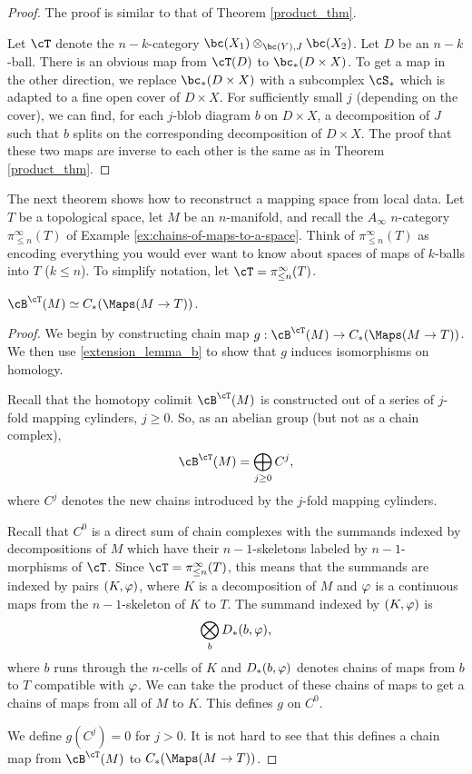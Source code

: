 \begin{proof}
The proof is similar to that of Theorem \ref{product_thm}.

Let $\cT$ denote the $n{-}k$-category $\bc(X_1) \otimes_{\bc(Y), J} \bc(X_2)$.
Let $D$ be an $n{-}k$-ball.
There is an obvious map from $\cT(D)$ to $\bc_*(D\times X)$.
To get a map in the other direction, we replace $\bc_*(D\times X)$ with a subcomplex
$\cS_*$ which is adapted to a fine open cover of $D\times X$.
For sufficiently small $j$ (depending on the cover), we can find, for each $j$-blob diagram $b$
on $D\times X$, a decomposition of $J$ such that $b$ splits on the corresponding
decomposition of $D\times X$.
The proof that these two maps are inverse to each other is the same as in
Theorem \ref{product_thm}.
\end{proof}


\medskip

The next theorem shows how to reconstruct a mapping space from local data.
Let $T$ be a topological space, let $M$ be an $n$-manifold, 
and recall the $A_\infty$ $n$-category $\pi^\infty_{\leq n}(T)$ 
of Example \ref{ex:chains-of-maps-to-a-space}.
Think of $\pi^\infty_{\leq n}(T)$ as encoding everything you would ever
want to know about spaces of maps of $k$-balls into $T$ ($k\le n$).
To simplify notation, let $\cT = \pi^\infty_{\leq n}(T)$.

\begin{thm} \label{thm:map-recon}
$\cB^\cT(M) \simeq C_*(\Maps(M\to T))$.
\end{thm}
\begin{proof}
We begin by constructing chain map $g: \cB^\cT(M) \to C_*(\Maps(M\to T))$.
We then use \ref{extension_lemma_b} to show that $g$ induces isomorphisms on homology.

Recall that the homotopy colimit $\cB^\cT(M)$ is constructed out of a series of
$j$-fold mapping cylinders, $j \ge 0$.
So, as an abelian group (but not as a chain complex), 
\[
	\cB^\cT(M) = \bigoplus_{j\ge 0} C^j,
\]
where $C^j$ denotes the new chains introduced by the $j$-fold mapping cylinders.

Recall that $C^0$ is a direct sum of chain complexes with the summands indexed by
decompositions of $M$ which have their $n{-}1$-skeletons labeled by $n{-}1$-morphisms
of $\cT$.
Since $\cT = \pi^\infty_{\leq n}(T)$, this means that the summands are indexed by pairs
$(K, \varphi)$, where $K$ is a decomposition of $M$ and $\varphi$ is a continuous
maps from the $n{-}1$-skeleton of $K$ to $T$.
The summand indexed by $(K, \varphi)$ is
\[
	\bigotimes_b D_*(b, \varphi),
\]
where $b$ runs through the $n$-cells of $K$ and $D_*(b, \varphi)$ denotes
chains of maps from $b$ to $T$ compatible with $\varphi$.
We can take the product of these chains of maps to get a chains of maps from
all of $M$ to $K$.
This defines $g$ on $C^0$.

We define $g(C^j) = 0$ for $j > 0$.
It is not hard to see that this defines a chain map from 
$\cB^\cT(M)$ to $C_*(\Maps(M\to T))$.




\end{proof}

